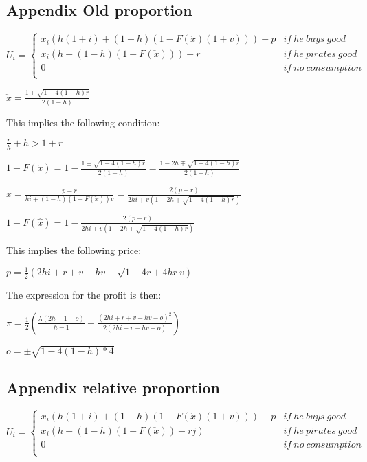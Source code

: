 \documentclass{article}
\begin{document}
\subsection{Appendix Old  proportion}

\[
U_i= \left\{
                \begin{array}{ll}
                  x_i(h(1+i)+(1-h)(1-F(\check{x})(1+v)))-p  & if ~ he ~ buys ~ good  \\
                  x_i(h+(1-h)(1-F(\check{x})))-r &  if ~ he ~ pirates ~ good \\
									0 & if ~ no ~ consumption  \\ 
                \end{array}
\right.
\]

$\check{x}= \frac{1 \pm \sqrt{1-4(1-h)r}}{2(1-h)}$ 

This implies the following condition:

$\frac{r}{h}+h>1+r$

$1-F(\check{x})= 1-\frac{1 \pm \sqrt{1-4(1-h)r}}{2(1-h)}=\frac{1-2h \mp \sqrt{1-4(1-h)r}}{2(1-h)}$ 

$\hat{x}=\frac{p-r}{hi+(1-h)(1-F(\check{x}))v}=\frac{2(p-r)}{2hi+v(1-2h \mp \sqrt{1-4(1-h)r})}$

$1-F(\hat{x})=1-\frac{2(p-r)}{2hi+v(1-2h \mp \sqrt{1-4(1-h)r})}$

This implies the following price:

$p = \frac{1}{2}(2hi+r+v-hv \mp \sqrt{1-4r+4hr} v)$

The expression for the profit is then: 

$\pi = \frac{1}{2}\left( \frac{\lambda(2h-1 + o)}{h-1} + \frac{(2hi+r+v-hv-o)^2}{2(2hi+v-hv-o)} \right)$

$o = \pm \sqrt{1-4(1-h)*4}$ 

\subsection{Appendix relative proportion}

\[
U_i= \left\{
                \begin{array}{ll}
                  x_i(h(1+i)+(1-h)(1-F(\check{x})(1+v)))-p  & if ~ he ~ buys ~ good  \\
                  x_i(h+(1-h)(1-F(\check{x}))-rj) &  if ~ he ~ pirates ~ good \\
									0 & if ~ no ~ consumption  \\ 
                \end{array}
\right.
\]
\end{document}
